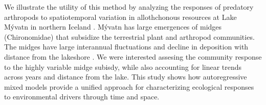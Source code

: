 We illustrate the utility of this method by analyzing the responses of predatory
arthropods to spatiotemporal variation in allothchonous resources \citep{Polis1997}
at Lake M\'{y}vatn in northern Iceland \citep{Einarsson2004}.
M\'{y}vatn has large emergences of midges
(Chironomidae) that subsidize the terrestrial plant \citep{Gratton2008}
and arthropod \citep{Dreyer2012} communities.
The midges have large interannual fluctuations \citep{Gardarsson2004}
and decline in deposition with distance from the lakeshore \citep{Dreyer2015}.
We were interested assesing the community response to
the highly variable midge subisdy, while also accounting for linear trends across years
and distance from the lake.
This study shows how autoregressive mixed models provide a unified approach
for characterizing ecological responses to environmental drivers through time and space.
